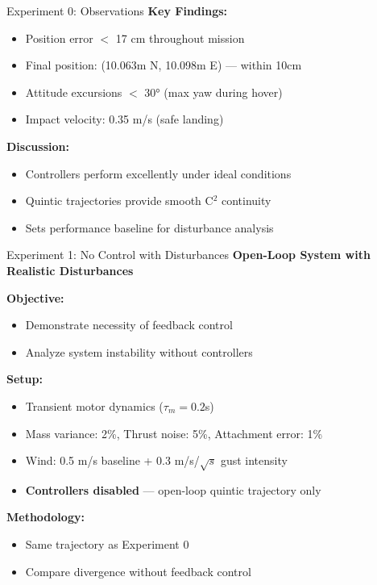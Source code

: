 \documentclass{beamer}
\begin{document}
\begin{frame}{Experiment 0: Observations}
\textbf{Key Findings:}
\begin{itemize}
    \item Position error $<$ 17 cm throughout mission
    \item Final position: (10.063m N, 10.098m E) --- within 10cm
    \item Attitude excursions $<$ 30° (max yaw during hover)
    \item Impact velocity: 0.35 m/s (safe landing)
\end{itemize}

\vspace{0.5cm}
\textbf{Discussion:}
\begin{itemize}
    \item Controllers perform excellently under ideal conditions
    \item Quintic trajectories provide smooth C$^2$ continuity
    \item Sets performance baseline for disturbance analysis
\end{itemize}
\end{frame}

\begin{frame}{Experiment 1: No Control with Disturbances}
\textbf{Open-Loop System with Realistic Disturbances}

\vspace{0.5cm}
\textbf{Objective:}
\begin{itemize}
    \item Demonstrate necessity of feedback control
    \item Analyze system instability without controllers
\end{itemize}

\vspace{0.5cm}
\textbf{Setup:}
\begin{itemize}
    \item Transient motor dynamics ($\tau_m = 0.2$s)
    \item Mass variance: 2\%, Thrust noise: 5\%, Attachment error: 1\%
    \item Wind: 0.5 m/s baseline + 0.3 m/s/$\sqrt{s}$ gust intensity
    \item \textbf{Controllers disabled} --- open-loop quintic trajectory only
\end{itemize}

\vspace{0.5cm}
\textbf{Methodology:}
\begin{itemize}
    \item Same trajectory as Experiment 0
    \item Compare divergence without feedback control
\end{itemize}
\end{frame}
\end{document}
